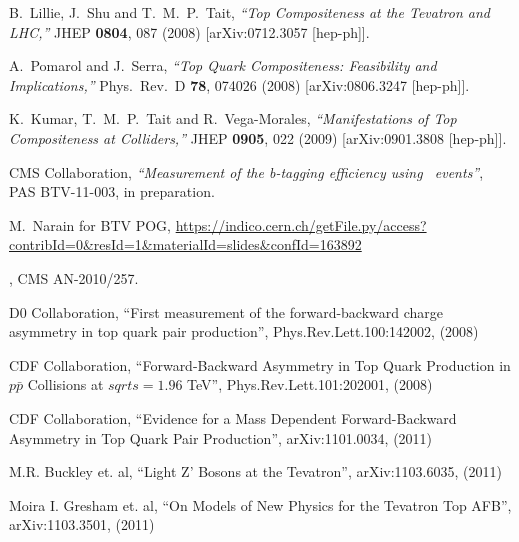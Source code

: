 \begin{thebibliography}{99}
  B.~Lillie, J.~Shu and T.~M.~P.~Tait,
  {\it ``Top Compositeness at the Tevatron and LHC,''}
  JHEP {\bf 0804}, 087 (2008)
  [arXiv:0712.3057 [hep-ph]].


  A.~Pomarol and J.~Serra,
  {\it ``Top Quark Compositeness: Feasibility and Implications,''}
  Phys.\ Rev.\ D {\bf 78}, 074026 (2008)
  [arXiv:0806.3247 [hep-ph]].


  K.~Kumar, T.~M.~P.~Tait and R.~Vega-Morales,
  {\it ``Manifestations of Top Compositeness at Colliders,''}
  JHEP {\bf 0905}, 022 (2009)
  [arXiv:0901.3808 [hep-ph]].




 CMS Collaboration, {{\it ``Measurement of the b-tagging efficiency using \ttbar\ events''}}, 
	PAS BTV-11-003, in preparation.

 M.~Narain for BTV POG, \url{https://indico.cern.ch/getFile.py/access?contribId=0&resId=1&materialId=slides&confId=163892}


, CMS AN-2010/257.


 {D0 Collaboration, ``First measurement of the forward-backward charge asymmetry in top quark pair production'', Phys.Rev.Lett.100:142002, (2008)}

 {CDF Collaboration, ``Forward-Backward Asymmetry in Top Quark Production in $p\bar{p}$ Collisions at $sqrt{s}=1.96$ TeV'', Phys.Rev.Lett.101:202001, (2008)}

 {CDF Collaboration, ``Evidence for a Mass Dependent Forward-Backward Asymmetry in Top Quark Pair Production'', arXiv:1101.0034, (2011)}


 {M.R. Buckley et. al, ``Light Z' Bosons at the Tevatron'', arXiv:1103.6035, (2011)}

 {Moira I. Gresham et. al, ``On Models of New Physics for the Tevatron Top AFB'', arXiv:1103.3501, (2011)}


\end{thebibliography}
